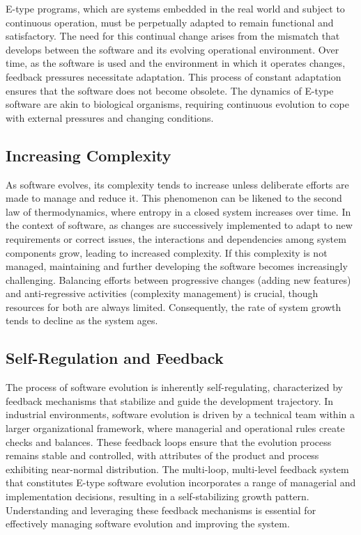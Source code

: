 E-type programs, which are systems embedded in the real world and subject to continuous operation, must be perpetually adapted to remain functional and satisfactory. The need for this continual change arises from the mismatch that develops between the software and its evolving operational environment. Over time, as the software is used and the environment in which it operates changes, feedback pressures necessitate adaptation. This process of constant adaptation ensures that the software does not become obsolete. The dynamics of E-type software are akin to biological organisms, requiring continuous evolution to cope with external pressures and changing conditions. 

\subsection{Increasing Complexity}

As software evolves, its complexity tends to increase unless deliberate efforts are made to manage and reduce it. This phenomenon can be likened to the second law of thermodynamics, where entropy in a closed system increases over time. In the context of software, as changes are successively implemented to adapt to new requirements or correct issues, the interactions and dependencies among system components grow, leading to increased complexity. If this complexity is not managed, maintaining and further developing the software becomes increasingly challenging. Balancing efforts between progressive changes (adding new features) and anti-regressive activities (complexity management) is crucial, though resources for both are always limited. Consequently, the rate of system growth tends to decline as the system ages.

\subsection{Self-Regulation and Feedback}

The process of software evolution is inherently self-regulating, characterized by feedback mechanisms that stabilize and guide the development trajectory. In industrial environments, software evolution is driven by a technical team within a larger organizational framework, where managerial and operational rules create checks and balances. These feedback loops ensure that the evolution process remains stable and controlled, with attributes of the product and process exhibiting near-normal distribution. The multi-loop, multi-level feedback system that constitutes E-type software evolution incorporates a range of managerial and implementation decisions, resulting in a self-stabilizing growth pattern. Understanding and leveraging these feedback mechanisms is essential for effectively managing software evolution and improving the system.



